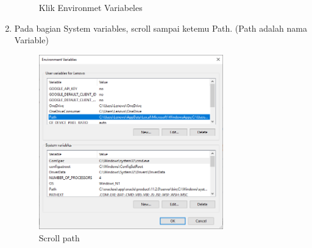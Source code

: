 \begin{enumerate}
\begin{figure}[!htpb]
			\centering
			\caption{Klik Environmet Variabeles}
		\end{figure}
		\newpage
    \item Pada bagian System variables, scroll sampai ketemu Path. (Path adalah nama Variable)
		\begin{figure}[!htpb]
			\includegraphics[width=8cm]{figures/sembil.PNG}
			\centering
			\caption{Scroll path}
		\end{figure}
			

\end{enumerate}
